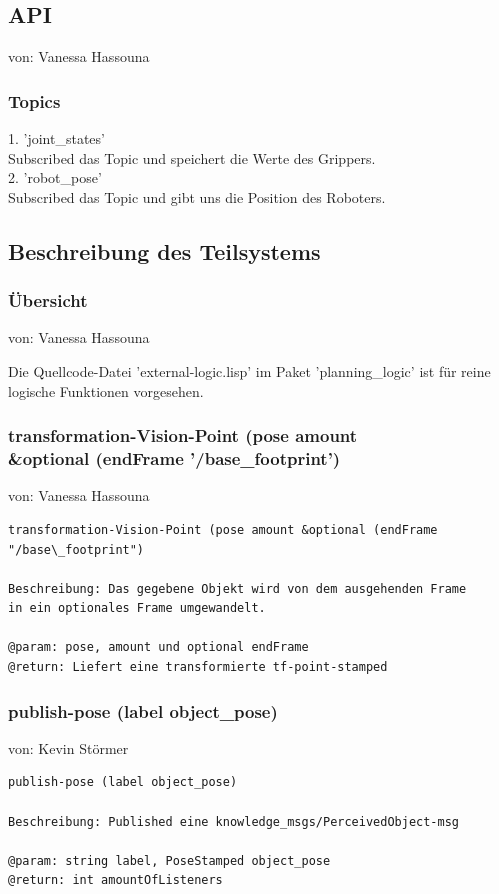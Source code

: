 \documentclass{suturo}
\makeatletter
\newcommand{\chapterauthor}[1]{%
  {\parindent0pt\vspace*{-27pt}%
  \linespread{0}\small\begin{flushright}von: #1\end{flushright}%
  \par\nobreak\vspace*{0pt}}
  \@afterheading%
}
\makeatother
\begin{document}
\subsection{API}
\chapterauthor{Vanessa Hassouna}
\subsubsection{Topics}
1. 'joint\_states' \\
Subscribed das Topic und speichert die Werte des Grippers.\\
 
2. 'robot\_pose' \\
Subscribed das Topic und gibt uns die Position des Roboters.
\subsection{Beschreibung des Teilsystems}

\subsubsection{\"Ubersicht}
\chapterauthor{Vanessa Hassouna}
Die Quellcode-Datei 'external-logic.lisp' im Paket 'planning\_logic' ist für reine logische Funktionen vorgesehen.



\subsubsection{transformation-Vision-Point (pose amount\\
\&optional (endFrame '/base\_footprint')}
\chapterauthor{Vanessa Hassouna}
\begin{verbatim}
transformation-Vision-Point (pose amount &optional (endFrame "/base\_footprint")

Beschreibung: Das gegebene Objekt wird von dem ausgehenden Frame
in ein optionales Frame umgewandelt.

@param: pose, amount und optional endFrame
@return: Liefert eine transformierte tf-point-stamped
\end{verbatim}


\subsubsection{publish-pose (label object\_pose)}
\chapterauthor{Kevin Störmer}
\begin{verbatim}
publish-pose (label object_pose)

Beschreibung: Published eine knowledge_msgs/PerceivedObject-msg

@param: string label, PoseStamped object_pose
@return: int amountOfListeners
\end{verbatim}
\end{document}
